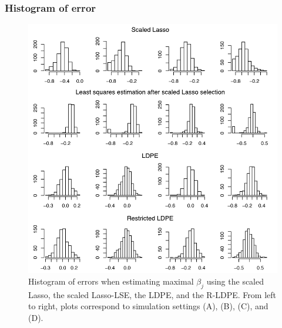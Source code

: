 \begin{frame}
\frametitle{Histogram of error}

\begin{centering}
\begin{figure}%
\includegraphics[width = 1.0\textwidth]{1110/hist_diff.pdf}
\caption{Histogram of errors when estimating maximal $\beta_j$ using the scaled Lasso,
{the scaled Lasso-LSE}, the LDPE, and the {R-LDPE}. From left to right,
plots correspond to simulation settings (A), (B), (C), and (D).}
\label{fig:hist}
\end{figure}
\end{centering}

\end{frame}


